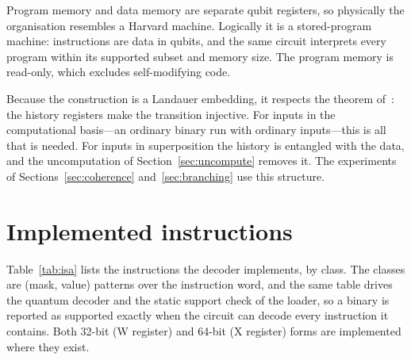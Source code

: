 \documentclass[11pt]{article}
\begin{document}
Program memory and data memory are separate qubit registers, so physically the organisation
resembles a Harvard machine. Logically it is a stored-program machine: instructions are data
in qubits, and the same circuit interprets every program within its supported subset and memory size. The program memory is read-only,
which excludes self-modifying code.

Because the construction is a Landauer embedding, it respects the theorem
of~\cite{yuan2024qcm}: the history registers make the transition injective. For inputs in
the computational basis---an ordinary binary run with ordinary inputs---this is all that is
needed. For inputs in superposition the history is entangled with the data, and the
uncomputation of Section~\ref{sec:uncompute} removes it. The experiments of
Sections~\ref{sec:coherence} and~\ref{sec:branching} use this structure.

\section{Implemented instructions}
\label{sec:isa}

Table~\ref{tab:isa} lists the instructions the decoder implements, by class. The classes are
(mask, value) patterns over the instruction word, and the same table drives the quantum
decoder and the static support check of the loader, so a binary is reported as supported
exactly when the circuit can decode every instruction it contains. Both 32-bit (W register)
and 64-bit (X register) forms are implemented where they exist.
\end{document}
